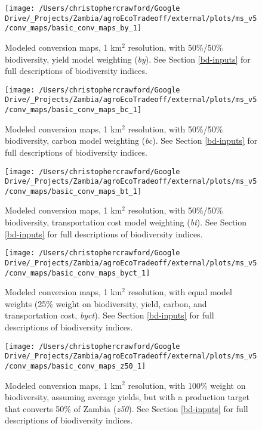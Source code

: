 \documentclass[
]{article}
\begin{document}
\begin{figure}
\texttt{[image: /Users/christophercrawford/Google Drive/\_Projects/Zambia/agroEcoTradeoff/external/plots/ms\_v5/conv\_maps/basic\_conv\_maps\_by\_1]} \caption{Modeled conversion maps, 1 km\(^2\) resolution, with 50\%/50\% biodiversity, yield model weighting (\emph{by}). See Section \ref{bd-inputs} for full descriptions of biodiversity indices.}\label{fig:conv-maps-1-by}
\end{figure}

\begin{figure}
\texttt{[image: /Users/christophercrawford/Google Drive/\_Projects/Zambia/agroEcoTradeoff/external/plots/ms\_v5/conv\_maps/basic\_conv\_maps\_bc\_1]} \caption{Modeled conversion maps, 1 km\(^2\) resolution, with 50\%/50\% biodiversity, carbon model weighting (\emph{bc}). See Section \ref{bd-inputs} for full descriptions of biodiversity indices.}\label{fig:conv-maps-1-bc}
\end{figure}

\begin{figure}
\texttt{[image: /Users/christophercrawford/Google Drive/\_Projects/Zambia/agroEcoTradeoff/external/plots/ms\_v5/conv\_maps/basic\_conv\_maps\_bt\_1]} \caption{Modeled conversion maps, 1 km\(^2\) resolution, with 50\%/50\% biodiversity, transportation cost model weighting (\emph{bt}). See Section \ref{bd-inputs} for full descriptions of biodiversity indices.}\label{fig:conv-maps-1-bt}
\end{figure}

\begin{figure}
\texttt{[image: /Users/christophercrawford/Google Drive/\_Projects/Zambia/agroEcoTradeoff/external/plots/ms\_v5/conv\_maps/basic\_conv\_maps\_byct\_1]} \caption{Modeled conversion maps, 1 km\(^2\) resolution, with equal model weights (25\% weight on biodiversity, yield, carbon, and transportation cost, \emph{byct}). See Section \ref{bd-inputs} for full descriptions of biodiversity indices.}\label{fig:conv-maps-1-byct}
\end{figure}

\begin{figure}
\texttt{[image: /Users/christophercrawford/Google Drive/\_Projects/Zambia/agroEcoTradeoff/external/plots/ms\_v5/conv\_maps/basic\_conv\_maps\_z50\_1]} \caption{Modeled conversion maps, 1 km\(^2\) resolution, with 100\% weight on biodiversity, assuming average yields, but with a production target that converts 50\% of Zambia (\emph{z50}). See Section \ref{bd-inputs} for full descriptions of biodiversity indices.}\label{fig:conv-maps-1-z50}
\end{figure}
\end{document}

